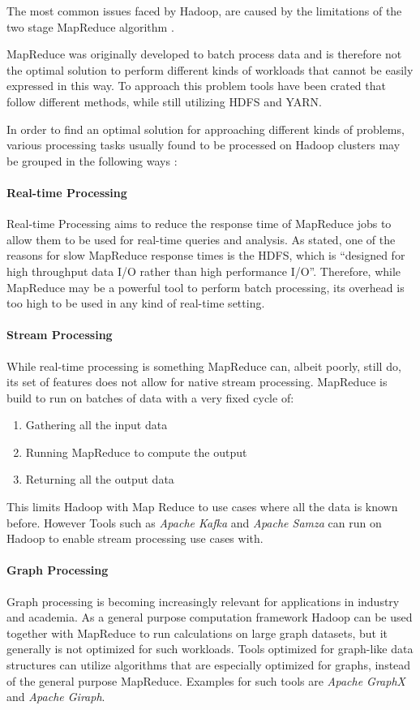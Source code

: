 The most common issues faced by Hadoop, are caused by the limitations of the two stage MapReduce algorithm \autocite[][]{6903263}. 

MapReduce was originally developed to batch process data and is
therefore not the optimal solution to perform different kinds of
workloads that cannot be easily expressed in this
way.\autocite{computers3040117}
To approach this problem tools have been crated that follow different methods, while still utilizing \ac{HDFS} and \ac{YARN}.

In order to find an optimal solution for approaching different kinds of problems, various processing tasks usually found to be processed on Hadoop clusters may be grouped in the following ways \autocite{computers3040117}:

\paragraph{Real-time Processing}
Real-time Processing aims to reduce the response time of MapReduce jobs to allow them to be used for real-time queries and analysis. As \autocite{computers3040117} stated, one of the reasons for slow MapReduce response times is the \ac{HDFS}, which is \enquote{designed for high throughput data I/O rather than high performance I/O}.
Therefore, while MapReduce may be a powerful tool to perform batch processing, its overhead is too high to be used in any kind of real-time setting.\autocite{computers3040117}

\paragraph{Stream Processing}
While real-time processing is something MapReduce can, albeit poorly, still do, its set of features does not allow for native stream processing. MapReduce is build to run on batches of data with a very fixed cycle of:
\begin{enumerate}
    \item Gathering all the input data
    \item Running MapReduce to compute the output
    \item Returning all the output data
\end{enumerate}
This limits Hadoop with Map Reduce to use cases where all the data is known before.
However Tools such as \emph{Apache Kafka} and \emph{Apache Samza} can run on Hadoop to enable stream processing use cases with.

\paragraph{Graph Processing}
Graph processing is becoming increasingly relevant for
applications in industry and academia. 
As a general purpose computation framework Hadoop 
can be used together with MapReduce to run calculations 
on large graph datasets, 
but it generally is not optimized for such workloads.\autocite[][]{Capota:2015:GBD:2764947.2764954} 
Tools optimized for graph-like data structures can utilize algorithms that are especially optimized for graphs, instead of the general purpose MapReduce.
Examples for such tools are \emph{Apache GraphX} and \emph{Apache Giraph}.

